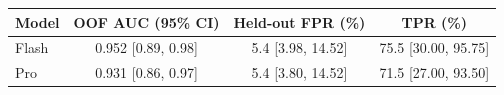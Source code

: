 \begin{tabular}{lccc}
\toprule
Model & OOF AUC (95\% CI) & Held-out FPR (\%) & TPR (\%) \\
\midrule
Flash & 0.952 [0.89, 0.98] & 5.4 [3.98, 14.52] & 75.5 [30.00, 95.75] \\
Pro & 0.931 [0.86, 0.97] & 5.4 [3.80, 14.52] & 71.5 [27.00, 93.50] \\
\bottomrule
\end{tabular}

